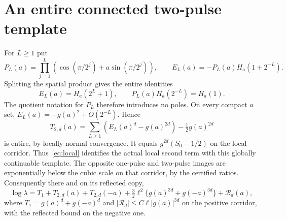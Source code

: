 \documentclass[11pt,a4paper]{article}
\begin{document}
\section{An entire connected two-pulse template}
For $L\ge1$ put
\[
 P_L(a)=\prod_{j=1}^L(\cos(\pi/2^j)+a\sin(\pi/2^j)),\qquad
 E_L(a)=-P_L(a)H_a(1+2^{-L}).
\]
Splitting the spatial product gives the entire identities
\[
 E_L(a)=H_a(2^L+1),\qquad P_L(a)H_a(2^{-L})=H_a(1).
\]
The quotient notation for $P_L$ therefore introduces no poles. On every compact $a$ set, $E_L(a)=-g(a)^2+O(2^{-L})$. Hence
\begin{equation}\label{eq:T2}
 T_{2,d}(a)=\sum_{L\ge1}(E_L(a)^d-g(a)^{2d})-\tfrac12g(a)^{2d}
\end{equation}
is entire, by locally normal convergence. It equals $g^{2d}(S_0-1/2)$ on the local corridor. Thus~\eqref{eq:local} identifies the actual local second term with this globally continuable template.
The opposite one-pulse and two-pulse images are exponentially below the cubic scale on that corridor, by the certified ratios. Consequently there and on its reflected copy,
\begin{equation}\label{eq:localsymmetric}
 \log\lambda=T_1+T_{2,d}(a)+T_{2,d}(-a)
 +\tfrac32\ell^2\{g(a)^{3d}+g(-a)^{3d}\}+\mathcal R_d(a),
\end{equation}
where $T_1=g(a)^d+g(-a)^d$ and $|\mathcal R_d|\le C\ell|g(a)|^{3d}$ on the positive corridor, with the reflected bound on the negative one.
\end{document}
